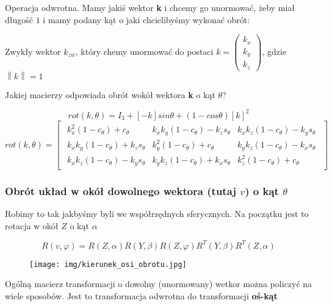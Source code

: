 \documentclass{article}
\newcommand{\norm}[1]{\left\lVert#1\right\rVert}
\begin{document}
\newpage

Operacja odwrotna.
Mamy jakiś wektor {\bf k} i chcemy go unormować, żeby miał długość $1$ i mamy
podany kąt o jaki chcielibyśmy wykonać obrót:


Zwykły wektor $k_{zw}$, który chemy unormować do postaci $k =
    \begin{pmatrix}
        k_{x} \\
        k_{y} \\
        k_{z}
    \end{pmatrix}$, gdzie $\norm{k}=1$

Jakiej macierzy odpowiada obrót wokół wektora {\bf k} o kąt $\theta$?


\Large
$$
    rot(k, \theta ) = I_{3} + [-k] sin \theta + (1-cos \theta ) [k]^2
$$
$$
    rot(k, \theta)=
    \begin{bmatrix}
        \begin{array}{c|c|c}
            k_{x}^{2}(1-c_{\theta})+c_{\theta}       & k_{x}k_{y}(1-c_{\theta})-k_{z}s_{\theta} & k_{x}k_{z}(1-c_{\theta})-k_{y}s_{\theta} \\[0.3em]
            \hline
            k_{x}k_{y}(1-c_{\theta})+k_{z}s_{\theta} & k_{y}^{2}(1-c_{\theta})+c_{\theta}       & k_{y}k_{z}(1-c_{\theta})-k_{x}s_{\theta} \\[0.3em]
            \hline
            k_{x}k_{z}(1-c_{\theta})-k_{y}s_{\theta} & k_{y}k_{z}(1-c_{\theta})+k_{x}s_{\theta} & k_{z}^{2}(1-c_{\theta})+c_{\theta}
        \end{array}
    \end{bmatrix}
$$
\normalsize

\subsubsection{Obrót układ w okół dowolnego wektora (tutaj $v$) o kąt $\theta$}

Robimy to tak jakbyśmy byli we współrzędnych sferycznych. Na początku jest to rotacja w okół $Z$ o kąt $\alpha$

\Large
$$
    R\left(v, \varphi\right)=
    R(Z, \alpha)R(Y,\beta)R(Z, \varphi)R^{T}(Y, \beta)R^{T}(Z, \alpha)
$$
\normalsize


\begin{figure}[h!]
    \centering
    \texttt{[image: img/kierunek\_osi\_obrotu.jpg]}
\end{figure}

Ogólną macierz transformacji o dowolny (unormowany) wetkor można policzyć na wiele sposobów.
Jest to transformacja odwrotna do transformacji {\bf oś-kąt}
\end{document}
